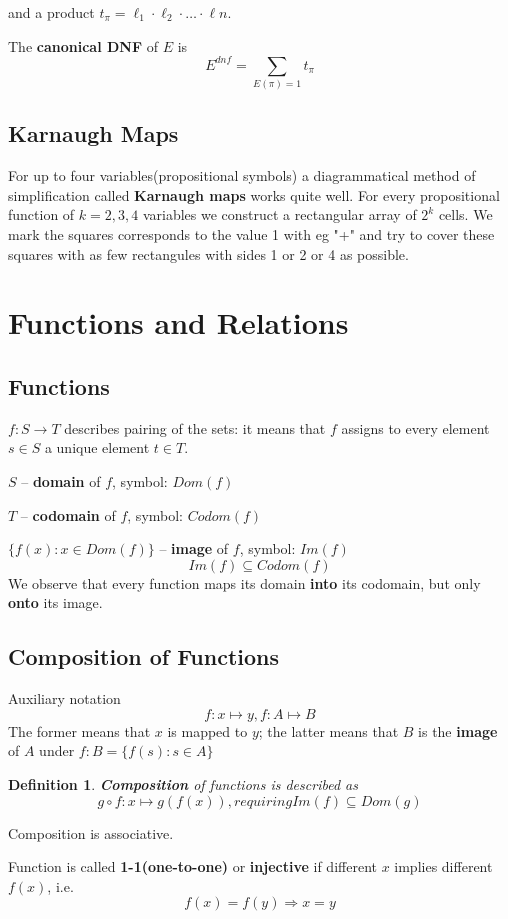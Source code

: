 \documentclass{ctexart}
\newtheorem{definition}{\indent Definition}[section]
\begin{document}
and a product $t_{\pi} =\ell_{1} \cdot \ell_{2} \cdot \ldots \cdot \ell{n}$.

The \textbf{canonical DNF} of $E$ is 
\[
    E^{dnf} = \sum_{E(\pi) = 1} t_{\pi}
\]

\subsection{Karnaugh Maps}

For up to four variables(propositional symbols) a diagrammatical method of simplification called \textbf{Karnaugh maps} works quite well. For every propositional function of $k = 2,3,4$ variables we construct a rectangular array of $2^k$ cells. We mark the squares corresponds to the value 1 with eg "+" and try to cover these squares with as few rectangules with sides 1 or 2 or 4 as possible.

\section{Functions and Relations}
\subsection{Functions}
$f : S \rightarrow T$ describes pairing of the sets: it means that $f$ assigns to every element $s \in S$ a unique element $t \in T$.

$S$ -- \textbf{domain} of $f$, symbol: $Dom(f)$

$T$ -- \textbf{codomain} of $f$, symbol: $Codom(f)$

$\{f(x): x \in Dom(f)\}$ -- \textbf{image} of $f$, symbol: $Im(f)$
\[
    Im(f) \subseteq Codom(f)
\]
We observe that every function maps its domain \textbf{into} its codomain, but only \textbf{onto} its image.
\subsection{Composition of Functions}
Auxiliary notation
\[
    f: x \mapsto y,  f: A \mapsto B
\]
The former means that $x$ is mapped to $y$; the latter means that $B$ is the \textbf{image} of $A$ under $f: B = \{f(s): s \in A\}$
\begin{definition}
    \textbf{Composition} of functions is described as
    \[
        g \circ f : x \mapsto g(f(x)), requiring Im(f) \subseteq Dom(g)
    \]
\end{definition}
Composition is associative.

Function is called \textbf{1-1(one-to-one)} or \textbf{injective} if different $x$ implies different $f(x)$, i.e.
\[
    f(x) = f(y) \Rightarrow x = y
\]
\end{document}

